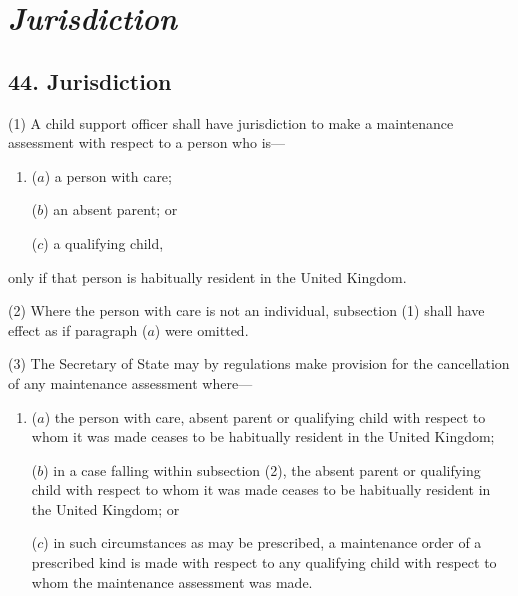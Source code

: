 \documentclass[12pt,a4paper]{article}
\begin{document}

\section{\itshape Jurisdiction}

\subsection{44. Jurisdiction}

(1) 
A child support officer 
shall have jurisdiction to make a maintenance assessment with respect to a person who is—
\begin{enumerate}\item[]
($a$) a person with care;

($b$) an absent parent; or

($c$) a qualifying child,
\end{enumerate}
only if that person is habitually resident in the United Kingdom.

(2) Where the person with care is not an individual, subsection (1)  shall have effect as if paragraph ($a$)  were omitted.

(3) The Secretary of State may by regulations make provision for the cancellation of any maintenance assessment where—
\begin{enumerate}\item[]
($a$) the person with care, absent parent or qualifying child with respect to whom it was made ceases to be habitually resident in the United Kingdom;

($b$) in a case falling within subsection (2), the absent parent or qualifying child with respect to whom it was made ceases to be habitually resident in the United Kingdom; or

($c$) in such circumstances as may be prescribed, a maintenance order of a prescribed kind is made with respect to any qualifying child with respect to whom the maintenance assessment was made.
\end{enumerate}

\end{document}
